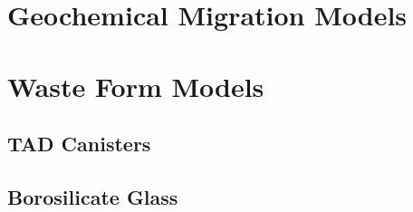 \section{Geochemical Migration Models}
\section{Waste Form Models}
\subsection{TAD Canisters}
\subsection{Borosilicate Glass}
